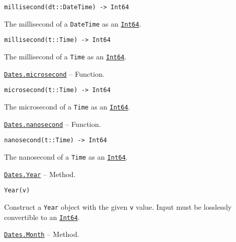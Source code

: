 \begin{adjustwidth}{2em}{0pt}


\begin{verbatim}
millisecond(dt::DateTime) -> Int64
\end{verbatim}

The millisecond of a \texttt{DateTime} as an \hyperlink{7720564657383125058}{\texttt{Int64}}.




\begin{lstlisting}
millisecond(t::Time) -> Int64
\end{lstlisting}

The millisecond of a \texttt{Time} as an \hyperlink{7720564657383125058}{\texttt{Int64}}.



\end{adjustwidth}
\hypertarget{13472031808151614256}{} 
\hyperlink{13472031808151614256}{\texttt{Dates.microsecond}}  -- {Function.}

\begin{adjustwidth}{2em}{0pt}


\begin{verbatim}
microsecond(t::Time) -> Int64
\end{verbatim}

The microsecond of a \texttt{Time} as an \hyperlink{7720564657383125058}{\texttt{Int64}}.



\end{adjustwidth}
\hypertarget{5077020706593048697}{} 
\hyperlink{5077020706593048697}{\texttt{Dates.nanosecond}}  -- {Function.}

\begin{adjustwidth}{2em}{0pt}


\begin{verbatim}
nanosecond(t::Time) -> Int64
\end{verbatim}

The nanosecond of a \texttt{Time} as an \hyperlink{7720564657383125058}{\texttt{Int64}}.



\end{adjustwidth}
\hypertarget{16556427820393178039}{} 
\hyperlink{16556427820393178039}{\texttt{Dates.Year}}  -- {Method.}

\begin{adjustwidth}{2em}{0pt}


\begin{verbatim}
Year(v)
\end{verbatim}

Construct a \texttt{Year} object with the given \texttt{v} value. Input must be losslessly convertible to an \hyperlink{7720564657383125058}{\texttt{Int64}}.



\end{adjustwidth}
\hypertarget{2872605566119772618}{} 
\hyperlink{2872605566119772618}{\texttt{Dates.Month}}  -- {Method.}

